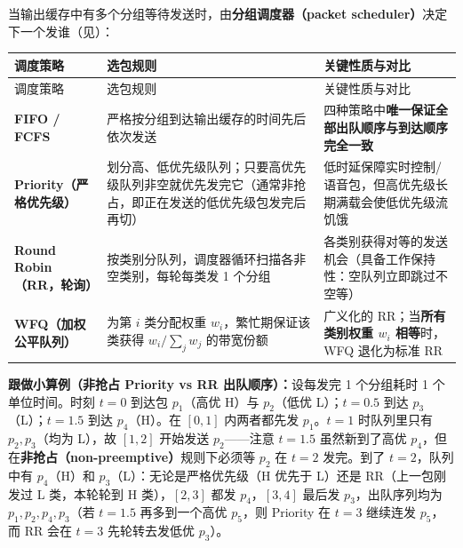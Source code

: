 当输出缓存中有多个分组等待发送时，由\textbf{分组调度器（packet scheduler）}决定下一个发谁（见）：
\begingroup\small\setlength{\tabcolsep}{3pt}\renewcommand{\arraystretch}{1.22}
\begin{longtable}{@{}>{\raggedright\arraybackslash}p{}>{\raggedright\arraybackslash}p{}>{\raggedright\arraybackslash}p{}@{}}
\toprule
调度策略 & 选包规则 & 关键性质与对比 \\
\midrule\endfirsthead
调度策略 & 选包规则 & 关键性质与对比 \\
\midrule\endhead
\bottomrule\endfoot
\textbf{FIFO / FCFS} & 严格按分组到达输出缓存的时间先后依次发送 & 四种策略中\textbf{唯一保证全部出队顺序与到达顺序完全一致} \\
\textbf{Priority（严格优先级）} & 划分高、低优先级队列；只要高优先级队列非空就优先发完它（通常非抢占，即正在发送的低优先级包发完后再切） & 低时延保障实时控制/语音包，但高优先级长期满载会使低优先级流饥饿 \\
\textbf{Round Robin（RR，轮询）} & 按类别分队列，调度器循环扫描各非空类别，每轮每类发 1 个分组 & 各类别获得对等的发送机会（具备工作保持性：空队列立即跳过不空等） \\
\textbf{WFQ（加权公平队列）} & 为第 $i$ 类分配权重 $w_i$，繁忙期保证该类获得 $w_i / \sum_j w_j$ 的带宽份额 & 广义化的 RR；当\textbf{所有类别权重 $w_i$ 相等}时，WFQ 退化为标准 RR \\
\end{longtable}\endgroup

\textbf{跟做小算例（非抢占 Priority vs RR 出队顺序）：}设每发完 1 个分组耗时 1 个单位时间。时刻 $t=0$ 到达包 $p_1$（高优 H）与 $p_2$（低优 L）；$t=0.5$ 到达 $p_3$（L）；$t=1.5$ 到达 $p_4$（H）。在 $[0, 1]$ 内两者都先发 $p_1$。$t=1$ 时队列里只有 $p_2, p_3$（均为 L），故 $[1, 2]$ 开始发送 $p_2$——注意 $t=1.5$ 虽然新到了高优 $p_4$，但在\textbf{非抢占（non-preemptive）}规则下必须等 $p_2$ 在 $t=2$ 发完。到了 $t=2$，队列中有 $p_4$（H）和 $p_3$（L）：无论是严格优先级（H 优先于 L）还是 RR（上一包刚发过 L 类，本轮轮到 H 类），$[2, 3]$ 都发 $p_4$，$[3, 4]$ 最后发 $p_3$，出队序列均为 $p_1, p_2, p_4, p_3$（若 $t=1.5$ 再多到一个高优 $p_5$，则 Priority 在 $t=3$ 继续连发 $p_5$，而 RR 会在 $t=3$ 先轮转去发低优 $p_3$）。



